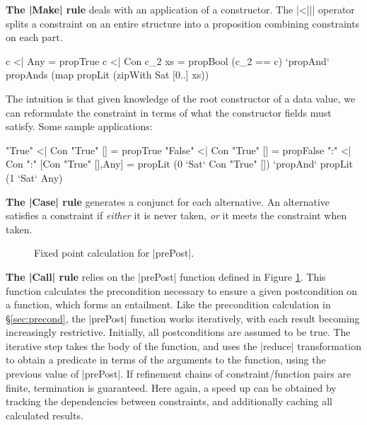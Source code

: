 \documentclass[preprint]{sigplanconf}
\newcommand{\para}[1]{\vspace{2mm}\noindent\textbf{#1}}
\begin{document}
\para{The |Make| rule} deals with an application of a constructor. The |<||| operator splits a constraint on an entire structure into a proposition combining constraints on each part.

\begin{code}
c <| Any         =  propTrue
c <| Con c_2 xs  =  propBool (c_2 == c) `propAnd`
                    propAnds (map propLit (zipWith Sat [0..] xs))
\end{code}

The intuition is that given knowledge of the root constructor of a data value, we can reformulate the constraint in terms of what the constructor fields must satisfy. Some sample applications:

\begin{code}
"True"   <| Con "True" [] = propTrue
"False"  <| Con "True" [] = propFalse
":" <| Con ":" [Con "True" [],Any]  =
    propLit (0 `Sat` Con "True" []) `propAnd` propLit (1 `Sat` Any)
\end{code}

\para{The |Case| rule} generates a conjunct for each alternative. An alternative satisfies a constraint if \textit{either} it is never taken, \textit{or} it meets the constraint when taken.

\begin{figure}
\ignore{}
\caption{Fixed point calculation for |prePost|.}
\label{fig:property_fixp}
\end{figure}

\para{The |Call| rule} relies on the |prePost| function defined in Figure \ref{fig:property_fixp}. This function calculates the precondition necessary to ensure a given postcondition on a function, which forms an entailment. Like the precondition calculation in \S\ref{sec:precond}, the |prePost| function works iteratively, with each result becoming increasingly restrictive. Initially, all postconditions are assumed to be true. The iterative step takes the body of the function, and uses the |reduce| transformation to obtain a predicate in terms of the arguments to the function, using the previous value of |prePost|. If refinement chains of constraint/function pairs are finite, termination is guaranteed. Here again, a speed up can be obtained by tracking the dependencies between constraints, and additionally caching all calculated results.
\end{document}

